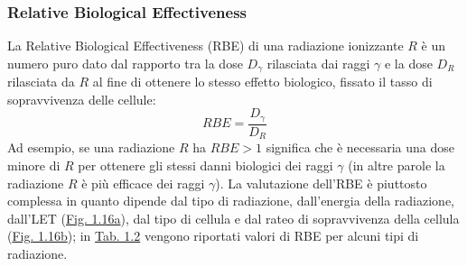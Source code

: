\documentclass[12pt,a4paper,twoside]{report}
\begin{document}
	\subsubsection{Relative Biological Effectiveness}
	La Relative Biological Effectiveness (RBE) di una radiazione ionizzante $R$ è un numero puro dato dal rapporto tra la dose $D_\gamma$ rilasciata dai raggi $\gamma$ e la dose $D_R$ rilasciata da $R$ al fine di ottenere lo stesso effetto biologico, fissato il tasso di sopravvivenza delle cellule:
	\begin{equation}
		RBE=\frac{D_\gamma}{D_R}
		\label{eq:rbe}
	\end{equation}
	Ad esempio, se una radiazione $R$ ha $RBE>1$ significa che è necessaria una dose minore di $R$ per ottenere gli stessi danni biologici dei raggi $\gamma$ (in altre parole la radiazione $R$ è più efficace dei raggi $\gamma$). La valutazione dell'RBE è piuttosto complessa in quanto dipende dal tipo di radiazione, dall'energia della radiazione, dall'LET (\hyperref[fig:let_rbe]{Fig. 1.16a}), dal tipo di cellula e dal rateo di sopravvivenza della cellula (\hyperref[fig:survival_dose]{Fig. 1.16b}); in \hyperref[tab:let_rbe]{Tab. 1.2} vengono riportati valori di RBE per alcuni tipi di radiazione.
	
\end{document}
